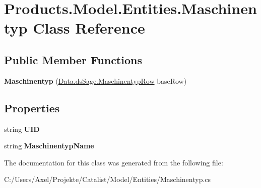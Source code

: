 \hypertarget{class_products_1_1_model_1_1_entities_1_1_maschinentyp}{}\section{Products.\+Model.\+Entities.\+Maschinentyp Class Reference}
\label{class_products_1_1_model_1_1_entities_1_1_maschinentyp}
\subsection*{Public Member Functions}
\begin{DoxyCompactItemize}
\item 
{\bfseries Maschinentyp} (\hyperlink{class_products_1_1_data_1_1ds_sage_1_1_maschinentyp_row}{Data.\+ds\+Sage.\+Maschinentyp\+Row} base\+Row)\hypertarget{class_products_1_1_model_1_1_entities_1_1_maschinentyp_a5a51095673d439de482c6bbdb9d84271}{}\label{class_products_1_1_model_1_1_entities_1_1_maschinentyp_a5a51095673d439de482c6bbdb9d84271}

\end{DoxyCompactItemize}
\subsection*{Properties}
\begin{DoxyCompactItemize}
\item 
string {\bfseries U\+ID}\hypertarget{class_products_1_1_model_1_1_entities_1_1_maschinentyp_a3945dac98dac67213f5cf75aa3e8d785}{}\label{class_products_1_1_model_1_1_entities_1_1_maschinentyp_a3945dac98dac67213f5cf75aa3e8d785}

\item 
string {\bfseries Maschinentyp\+Name}\hypertarget{class_products_1_1_model_1_1_entities_1_1_maschinentyp_a95262b41bb23c6af9c5dc75dcd0f9c93}{}\label{class_products_1_1_model_1_1_entities_1_1_maschinentyp_a95262b41bb23c6af9c5dc75dcd0f9c93}

\end{DoxyCompactItemize}


The documentation for this class was generated from the following file\+:\begin{DoxyCompactItemize}
\item 
C\+:/\+Users/\+Axel/\+Projekte/\+Catalist/\+Model/\+Entities/Maschinentyp.\+cs\end{DoxyCompactItemize}
